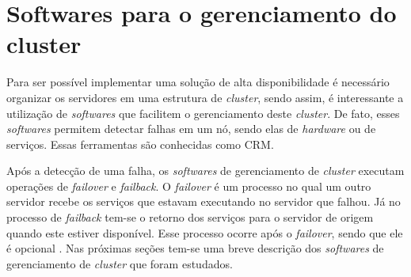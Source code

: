 

\section{Softwares para o gerenciamento do cluster}
\label{section:toolcluster}

Para ser possível implementar uma solução de alta disponibilidade é necessário organizar os servidores em uma estrutura de \textit{cluster},
sendo assim, é interessante a utilização de \textit{softwares} que facilitem o gerenciamento deste \textit{cluster}. De fato, esses 
\textit{softwares} permitem detectar falhas em um nó, sendo elas de \textit{hardware} ou de serviços. Essas ferramentas são conhecidas como 
\ac{CRM}. 

Após a detecção de uma falha, os \textit{softwares} de gerenciamento de \textit{cluster} executam operações de \textit{failover} e 
\textit{failback}. O \textit{failover} é um processo no qual um outro servidor recebe os serviços que estavam executando no servidor que falhou. 
Já no processo de \textit{failback} tem-se o retorno dos serviços para o servidor de origem quando este estiver disponível. Esse processo ocorre 
após o \textit{failover}, sendo que ele é opcional \cite{bassan2008}. Nas próximas seções tem-se uma breve descrição dos \textit{softwares} de 
gerenciamento de \textit{cluster} que foram estudados.


